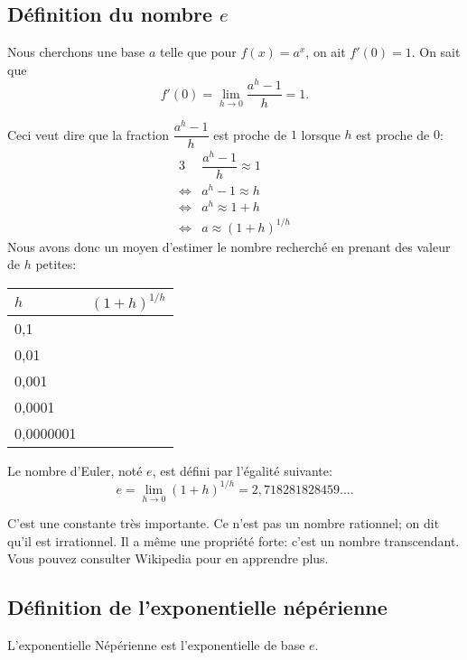 \documentclass[a4paper,12pt,singlepage]{report}
\begin{document}
\subsection{Définition du nombre \(e\)}
\label{sec:org83963b9}

Nous cherchons une base \(a\) telle que pour \(f(x)=a^x\), on ait \(f'(0)=1\). On sait
que
\[
f'(0)=\lim_{h\to 0} \frac{a^{h}-1}{h}=1.
\]

Ceci veut dire que la fraction \(\dfrac{a^{h}-1}{h}\) est proche de \(1\) lorsque
\(h\) est proche de \(0\):
\begin{alignat*}{3}
&\dfrac{a^{h}-1}{h}\approx 1\\
\Leftrightarrow& a^h-1\approx h\\
\Leftrightarrow&a^h\approx 1+h\\
\Leftrightarrow&a\approx (1+h)^{1/h}
\end{alignat*}
Nous avons donc un moyen d'estimer le nombre recherché en prenant des valeur de
\(h\) petites:
\begin{center}
\begin{tabular}{|p{3cm}|p{3cm}|}
\hline
\(h\) & \((1+h)^{1/h}\)\\[0pt]
\hline
0,1 & \\[0pt]
\hline
0,01 & \\[0pt]
\hline
0,001 & \\[0pt]
\hline
0,0001 & \\[0pt]
\hline
0,0000001 & \\[0pt]
\hline
\end{tabular}
\end{center}

\begin{definition}
Le nombre d'Euler, noté \(e\), est défini par l'égalité suivante:
\[
e=\lim_{h\to 0}(1+h)^{1/h}=2,718281828459\ldots.
\]
\end{definition}

C'est une constante très importante. Ce n'est pas un nombre rationnel; on dit
qu'il est irrationnel. Il a même une propriété forte: c'est un nombre
transcendant. Vous pouvez consulter Wikipedia pour en apprendre plus.


\subsection{Définition de l'exponentielle népérienne}
\label{sec:org9189d34}
\begin{definition}
L'exponentielle Népérienne est l'exponentielle de base \(e\).
\end{definition}
\end{document}
